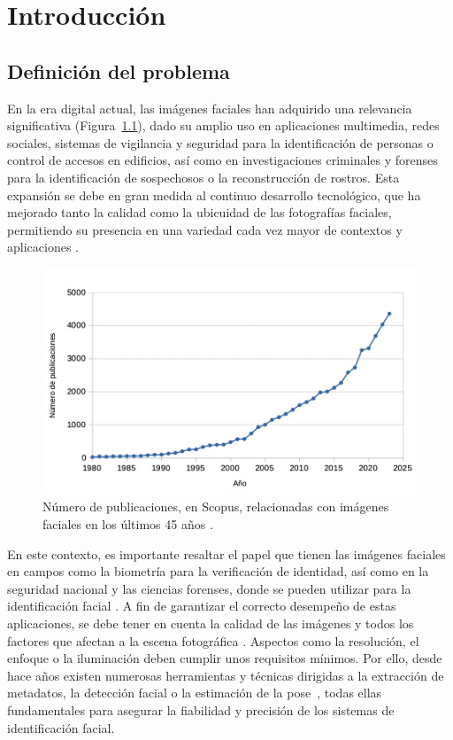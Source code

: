 \chapter{Introducción}
\thispagestyle{empty}

\section{Definición del problema}

En la era digital actual, las imágenes faciales han adquirido una relevancia significativa (Figura~\ref{fig1}), dado su amplio uso  en aplicaciones multimedia, redes sociales, sistemas de vigilancia y seguridad para la identificación de personas o control de accesos en edificios, así como en investigaciones criminales y forenses para la identificación de sospechosos o la reconstrucción de rostros.
Esta expansión se debe en gran medida al continuo desarrollo tecnológico, que ha mejorado tanto la calidad como la ubicuidad de las fotografías faciales, permitiendo su presencia en una variedad cada vez mayor de contextos y aplicaciones \cite{74,75,76,77}.

\begin{figure}[H]
	\centering
	\includegraphics[scale=0.6]{imagenes/cap1/tabla_facial_images.png}
	\caption[Número de publicaciones de imágenes faciales.]{Número de publicaciones, en Scopus, relacionadas con imágenes faciales en los últimos 45 años \protect\footnotemark.}
	\label{fig1}
\end{figure}


En este contexto, es importante resaltar el papel que tienen las imágenes faciales en campos como la biometría para la verificación de identidad, así como en la seguridad nacional y las ciencias forenses, donde se pueden utilizar para la identificación facial \cite{80, 81, 82}. A fin de garantizar el correcto desempeño de estas aplicaciones, se debe tener en cuenta la calidad de las imágenes y todos los factores que afectan a la escena fotográfica \cite{86,87}. Aspectos como la resolución, el enfoque o la iluminación deben cumplir unos requisitos mínimos. Por ello, desde hace años existen numerosas herramientas y técnicas dirigidas a la extracción de metadatos, la detección facial \cite{83, 84} o la estimación de la pose~\cite{56, 85}, todas ellas fundamentales para asegurar la fiabilidad y precisión de los sistemas de identificación facial.

